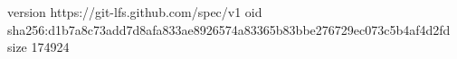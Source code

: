 version https://git-lfs.github.com/spec/v1
oid sha256:d1b7a8c73add7d8afa833ae8926574a83365b83bbe276729ec073c5b4af4d2fd
size 174924
